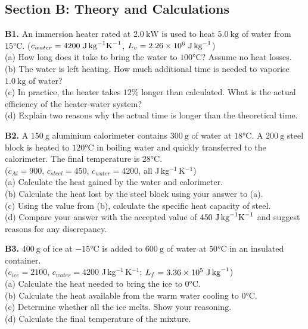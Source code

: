 \begin{exercisebox}[15]
\vspace{0.6cm}

\subsection*{Section B: Theory and Calculations}

\textbf{B1.} An immersion heater rated at $2.0\ \text{kW}$
is used to heat $5.0\ \text{kg}$ of water from
$15°\text{C}$.
($c_{water} = 4200\ \text{J\,kg}^{-1}\text{K}^{-1}$,
$L_v = 2.26\times10^6\ \text{J\,kg}^{-1}$)\\[4pt]
(a) How long does it take to bring the water to
$100°\text{C}$? Assume no heat losses.\\
(b) The water is left heating. How much additional
time is needed to vaporise $1.0\ \text{kg}$ of water?\\
(c) In practice, the heater takes $12\%$ longer
than calculated. What is the actual efficiency
of the heater-water system?\\
(d) Explain two reasons why the actual time is
longer than the theoretical time.
\hfill{}

\vspace{0.4cm}

\textbf{B2.} A $150\ \text{g}$ aluminium calorimeter
contains $300\ \text{g}$ of water at $18°\text{C}$.
A $200\ \text{g}$ steel block is heated to $120°\text{C}$
in boiling water and quickly transferred to the
calorimeter. The final temperature is $28°\text{C}$.\\
($c_{Al} = 900$, $c_{steel} = 450$,
$c_{water} = 4200$, all J\,kg$^{-1}$\,K$^{-1}$)\\[4pt]
(a) Calculate the heat gained by the water and
calorimeter.\\
(b) Calculate the heat lost by the steel block
using your answer to (a).\\
(c) Using the value from (b), calculate the
specific heat capacity of steel.\\
(d) Compare your answer with the accepted value of
$450\ \text{J\,kg}^{-1}\text{K}^{-1}$ and suggest
reasons for any discrepancy.
\hfill{}

\vspace{0.4cm}

\textbf{B3.} $400\ \text{g}$ of ice at $-15°\text{C}$
is added to $600\ \text{g}$ of water at $50°\text{C}$
in an insulated container.\\
($c_{ice} = 2100$, $c_{water} = 4200$
J\,kg$^{-1}$\,K$^{-1}$;
$L_f = 3.36\times10^5\ \text{J\,kg}^{-1}$)\\[4pt]
(a) Calculate the heat needed to bring the ice to
$0°\text{C}$.\\
(b) Calculate the heat available from the warm
water cooling to $0°\text{C}$.\\
(c) Determine whether all the ice melts. Show your
reasoning.\\
(d) Calculate the final temperature of the mixture.
\hfill{}


\end{exercisebox}
